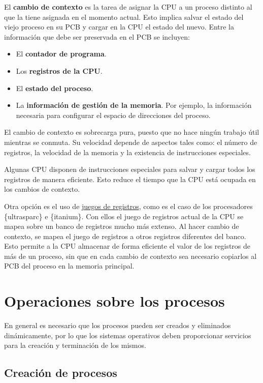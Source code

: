 El \textbf{{}cambio de contexto} es la tarea de asignar la CPU a un
proceso distinto al que la tiene asignada en el momento actual. Esto
implica salvar el estado del viejo proceso en su PCB y cargar en la CPU
el estado del nuevo. Entre la información que debe ser preservada en el
PCB se incluyen:

\begin{itemize}
\item
  El \textbf{contador de programa}.
\item
  Los \textbf{registros de la CPU}.
\item
  El \textbf{estado del proceso}.
\item
  La \textbf{información de gestión de la memoria}. Por ejemplo, la
  información necesaria para configurar el espacio de direcciones del
  proceso.
\end{itemize}

El cambio de contexto es sobrecarga pura, puesto que no hace ningún
trabajo útil mientras se conmuta. Su velocidad depende de aspectos tales
como: el número de registros, la velocidad de la memoria y la existencia
de instrucciones especiales.

Algunas CPU disponen de instrucciones especiales para salvar y cargar
todos los registros de manera eficiente. Esto reduce el tiempo que la
CPU está ocupada en los cambios de contexto.

Otra opción es el uso de
\href{https://en.wikipedia.org/wiki/Register_file}{juegos de registros},
como es el caso de los procesadores \{ultrasparc\} e \{itanium\}. Con
ellos el juego de registros actual de la CPU se mapea sobre un banco de
registros mucho más extenso. Al hacer cambio de contexto, se mapea el
juego de registros a otros registros diferentes del banco. Esto permite
a la CPU almacenar de forma eficiente el valor de los registros de más
de un proceso, sin que en cada cambio de contexto sea necesario
copiarlos al PCB del proceso en la memoria principal.

\section{Operaciones sobre los
procesos}\label{_operaciones_sobre_los_procesos}

En general es necesario que los procesos pueden ser creados y eliminados
dinámicamente, por lo que los sistemas operativos deben proporcionar
servicios para la creación y terminación de los mismos.

\subsection{Creación de procesos}\label{_creacion_de_procesos}

